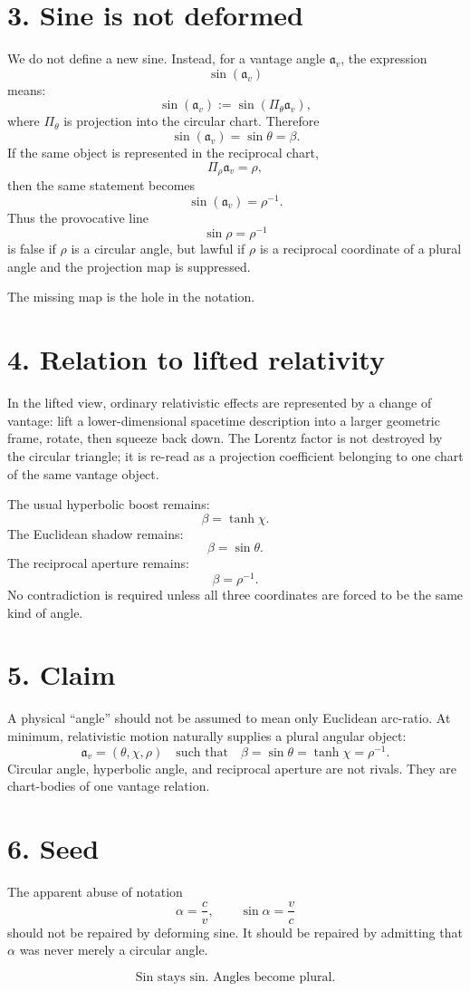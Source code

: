 \documentclass[10pt]{article}
\begin{document}
\section*{3. Sine is not deformed}

We do not define a new sine.
Instead, for a vantage angle $\mathfrak a_v$, the expression
\[
\sin(\mathfrak a_v)
\]
means:
\[
\sin(\mathfrak a_v):=\sin(\Pi_\theta \mathfrak a_v),
\]
where $\Pi_\theta$ is projection into the circular chart. Therefore
\[
\sin(\mathfrak a_v)=\sin\theta=\beta.
\]
If the same object is represented in the reciprocal chart,
\[
\Pi_\rho \mathfrak a_v=\rho,
\]
then the same statement becomes
\[
\sin(\mathfrak a_v)=\rho^{-1}.
\]
Thus the provocative line
\[
\sin\rho=\rho^{-1}
\]
is false if $\rho$ is a circular angle, but lawful if $\rho$ is a reciprocal
coordinate of a plural angle and the projection map is suppressed.

The missing map is the hole in the notation.

\section*{4. Relation to lifted relativity}

In the lifted view, ordinary relativistic effects are represented by a change of
vantage: lift a lower-dimensional spacetime description into a larger geometric
frame, rotate, then squeeze back down.
The Lorentz factor is not destroyed by the circular triangle;
it is re-read as a projection coefficient belonging to one chart of the same
vantage object.

The usual hyperbolic boost remains:
\[
\beta=\tanh\chi.
\]
The Euclidean shadow remains:
\[
\beta=\sin\theta.
\]
The reciprocal aperture remains:
\[
\beta=\rho^{-1}.
\]
No contradiction is required unless all three coordinates are forced to be the
same kind of angle.

\section*{5. Claim}

A physical ``angle'' should not be assumed to mean only Euclidean arc-ratio.
At minimum, relativistic motion naturally supplies a plural angular object:
\[
\boxed{
\mathfrak a_v=(\theta,\chi,\rho)
\quad\text{such that}\quad
\beta=\sin\theta=\tanh\chi=\rho^{-1}.
}
\]
Circular angle, hyperbolic angle, and reciprocal aperture are not rivals.
They are chart-bodies of one vantage relation.

\section*{6. Seed}

The apparent abuse of notation
\[
\alpha=\frac{c}{v},\qquad \sin\alpha=\frac{v}{c}
\]
should not be repaired by deforming sine.
It should be repaired by admitting that $\alpha$ was never merely a circular
angle.

\[
\boxed{\text{Sin stays sin. Angles become plural.}}
\]
\end{document}
